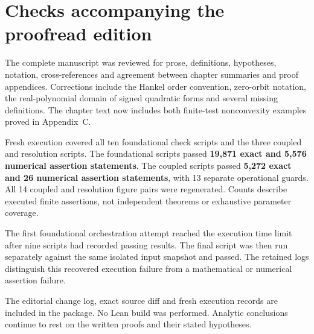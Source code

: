 \section*{Checks accompanying the proofread edition}
The complete manuscript was reviewed for prose, definitions, hypotheses,
notation, cross-references and agreement between chapter summaries and proof
appendices. Corrections include the Hankel order convention, zero-orbit
notation, the real-polynomial domain of signed quadratic forms and several
missing definitions. The chapter text now includes both finite-test
nonconvexity examples proved in Appendix~C.

Fresh execution covered all ten foundational check scripts and the three
coupled and resolution scripts. The foundational scripts passed
\textbf{19,871 exact and 5,576 numerical assertion statements}. The coupled
scripts passed \textbf{5,272 exact and 26 numerical assertion statements},
with 13 separate operational guards. All 14 coupled and resolution figure
pairs were regenerated. Counts describe executed finite assertions, not
independent theorems or exhaustive parameter coverage.

The first foundational orchestration attempt reached the execution time
limit after nine scripts had recorded passing results. The final script was
then run separately against the same isolated input snapshot and passed.
The retained logs distinguish this recovered execution failure from a
mathematical or numerical assertion failure.

The editorial change log, exact source diff and fresh execution records are
included in the package. No Lean build was performed. Analytic conclusions
continue to rest on the written proofs and their stated hypotheses.

